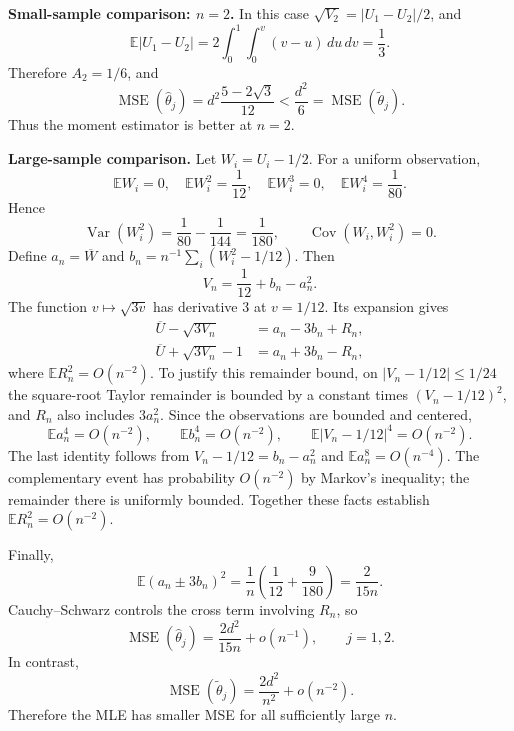 \documentclass[lang=en,11pt,a4paper,citestyle=authoryear]{elegantpaper}
\newcommand{\E}{\mathbb{E}}
\begin{document}
\begin{enumerate}[label=(\roman*),leftmargin=*]
\medskip
\noindent\textbf{Small-sample comparison: $n=2$.}
In this case $\sqrt{V_2}=|U_1-U_2|/2$, and
\[
\E|U_1-U_2|
=2\int_0^1\int_0^v(v-u)\,du\,dv=\frac13.
\]
Therefore $A_2=1/6$, and
\[
\operatorname{MSE}(\widehat\theta_j)
=d^2\frac{5-2\sqrt3}{12}
<\frac{d^2}{6}
=\operatorname{MSE}(\widetilde\theta_j).
\]
Thus the moment estimator is better at $n=2$.

\medskip
\noindent\textbf{Large-sample comparison.}
Let $W_i=U_i-1/2$. For a uniform observation,
\[
\E W_i=0,\quad \E W_i^2=\frac1{12},\quad
\E W_i^3=0,\quad \E W_i^4=\frac1{80}.
\]
Hence
\[
\operatorname{Var}(W_i^2)=\frac1{80}-\frac1{144}
=\frac1{180},
\qquad \operatorname{Cov}(W_i,W_i^2)=0.
\]
Define $a_n=\overline W$ and
$b_n=n^{-1}\sum_i(W_i^2-1/12)$. Then
\[
V_n=\frac1{12}+b_n-a_n^2.
\]
The function $v\mapsto\sqrt{3v}$ has derivative $3$ at $v=1/12$.
Its expansion gives
\[
\begin{aligned}
\overline U-\sqrt{3V_n}&=a_n-3b_n+R_n,\\
\overline U+\sqrt{3V_n}-1&=a_n+3b_n-R_n,
\end{aligned}
\]
where $\E R_n^2=O(n^{-2})$.
To justify this remainder bound, on $|V_n-1/12|\le1/24$ the
square-root Taylor remainder is bounded by a constant times
$(V_n-1/12)^2$, and $R_n$ also includes $3a_n^2$.
Since the observations are bounded and centered,
\[
\E a_n^4=O(n^{-2}),\qquad
\E b_n^4=O(n^{-2}),\qquad
\E|V_n-1/12|^4=O(n^{-2}).
\]
The last identity follows from $V_n-1/12=b_n-a_n^2$
and $\E a_n^8=O(n^{-4})$.
The complementary event has probability $O(n^{-2})$ by Markov's
inequality; the remainder there is uniformly bounded.
Together these facts establish $\E R_n^2=O(n^{-2})$.

Finally,
\[
\E(a_n\pm3b_n)^2
=\frac1n\left(\frac1{12}+\frac9{180}\right)
=\frac{2}{15n}.
\]
Cauchy--Schwarz controls the cross term involving $R_n$, so
\[
{
\operatorname{MSE}(\widehat\theta_j)
=\frac{2d^2}{15n}+o(n^{-1}),
\qquad j=1,2.}
\]
In contrast,
\[
\operatorname{MSE}(\widetilde\theta_j)
=\frac{2d^2}{n^2}+o(n^{-2}).
\]
Therefore the MLE has smaller MSE for all sufficiently large $n$.
\end{enumerate}
\end{document}
